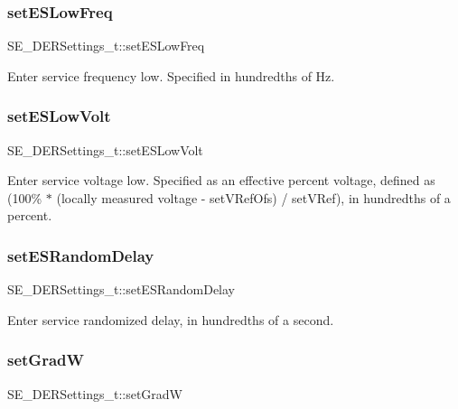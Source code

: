 \subsubsection{\texorpdfstring{set\+E\+S\+Low\+Freq}{setESLowFreq}}
{\footnotesize\ttfamily S\+E\+\_\+\+D\+E\+R\+Settings\+\_\+t\+::set\+E\+S\+Low\+Freq}

Enter service frequency low. Specified in hundredths of Hz. \mbox{\label{group__DERSettings_ga853797a5f4bfd6f027af1c57739b5574}} 
\subsubsection{\texorpdfstring{set\+E\+S\+Low\+Volt}{setESLowVolt}}
{\footnotesize\ttfamily S\+E\+\_\+\+D\+E\+R\+Settings\+\_\+t\+::set\+E\+S\+Low\+Volt}

Enter service voltage low. Specified as an effective percent voltage, defined as (100\% $\ast$ (locally measured voltage -\/ set\+V\+Ref\+Ofs) / set\+V\+Ref), in hundredths of a percent. \mbox{\label{group__DERSettings_gabc0d530d1a2b90d4e8c32bed0b98a43d}} 
\subsubsection{\texorpdfstring{set\+E\+S\+Random\+Delay}{setESRandomDelay}}
{\footnotesize\ttfamily S\+E\+\_\+\+D\+E\+R\+Settings\+\_\+t\+::set\+E\+S\+Random\+Delay}

Enter service randomized delay, in hundredths of a second. \mbox{\label{group__DERSettings_ga309dff8cb09ae5f058c2eaf57f0129b2}} 
\subsubsection{\texorpdfstring{set\+GradW}{setGradW}}
{\footnotesize\ttfamily S\+E\+\_\+\+D\+E\+R\+Settings\+\_\+t\+::set\+GradW}

